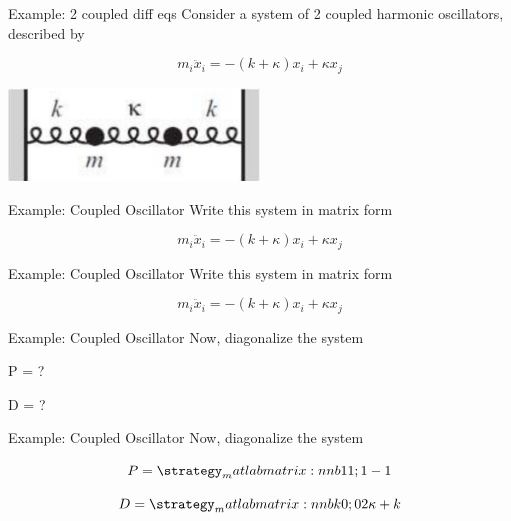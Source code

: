 \documentclass{beamer}
\begin{document}
	\begin{frame}{Example: 2 coupled diff eqs}
	    Consider a system of 2 coupled harmonic oscillators, described by

        $$m_i\ddot{x}_i = -(k + \kappa)x_i + \kappa{}x_j$$
        
        \begin{center}
            \includegraphics[width=0.5\textwidth]{coupled-eq-1.png}
        \end{center}
	\end{frame}
	
	\begin{frame}{Example: Coupled Oscillator}
	    Write this system in matrix form
        
        $$m_i\ddot{x}_i = -(k + \kappa)x_i + \kappa{}x_j$$
	\end{frame}
	
	\begin{frame}{Example: Coupled Oscillator}
	    Write this system in matrix form
        
        $$m_i\ddot{x}_i = -(k + \kappa)x_i + \kappa{}x_j$$
        
        \begin{center}
        \end{center}
	\end{frame}
	
	\begin{frame}{Example: Coupled Oscillator}
	    Now, diagonalize the system

	    \begin{center}
        \end{center}
        
        P = ?
        
        D = ?
	\end{frame}
	
	\begin{frame}{Example: Coupled Oscillator}
	    Now, diagonalize the system

	    \begin{center}
        \end{center}
        
        $$P = \mat{1 1; 1 -1}$$
        
        $$D = \mat{k 0; 0 2\kappa+k}$$
	\end{frame}
	
\end{document}
